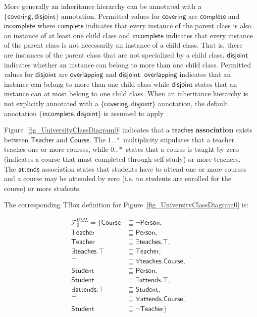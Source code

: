 \documentclass{amsart}
\begin{document}
       More generally an inheritance hierarchy can be annotated with a $\{\mathsf{covering, disjoint}\}$ annotation. Permitted values for $\mathsf{covering}$ are $\mathsf{complete}$ and $\mathsf{incomplete}$ where $\mathsf{complete}$ indicates that  every instance of the parent class is also an instance of at least one child class and $\mathsf{incomplete}$ indicates that every instance of the parent class is not necessarily an instance of a child class.  That is, there are instances of the parent class that are not specialized by a child class.  $\mathsf{disjoint}$ indicates whether an instance can belong to more than one child class.  Permitted values for $\mathsf{disjoint}$ are $\mathsf{overlapping}$ and $\mathsf{disjoint}$. $\mathsf{overlapping}$ indicates that an instance can belong to more than one child class while $\mathsf{disjoint}$ states  that an instance can at most belong to one child class. When an inheritance hierarchy is not explicitly annotated with a $\{\mathsf{covering, disjoint}\}$ annotation, the default annotation $\{\mathsf{incomplete, disjoint}\}$ is assumed to apply~\cite{UML2.5.1}. 
     
     Figure~\ref{fig_UniversityClassDiagram0} indicates that a $\mathsf{teaches}$ \textbf{association} exists between $\mathsf{Teacher}$ and $\mathsf{Course}$. The $1..*$ multiplicity stipulates that a teacher teaches one or more courses, while $0..*$ states that a course is taught by zero (indicates a course that must completed through self-study) or more teachers. The $\mathsf{attends}$ association states that students have to attend one or more courses and a course may be attended by zero (i.e. no students are enrolled for the course) or more students. 
     
     The corresponding TBox definition for Figure~\ref{fig_UniversityClassDiagram0} is:
     
   \begin{align}
  \mathcal{T}_0^{UML} = \{\mathsf{Course} &\sqsubseteq \neg \mathsf{Person},\\
  \mathsf{Teacher} &\sqsubseteq \mathsf{Person}, \\
  \mathsf{Teacher} &\sqsubseteq \exists \mathsf{teaches}.\top, \\
  \exists\mathsf{teaches}.\top &\sqsubseteq \mathsf{Teacher}, \\
  \top &\sqsubseteq \forall \mathsf{teaches}.\mathsf{Course}, \\
  \mathsf{Student} &\sqsubseteq \mathsf{Person},\\
  \mathsf{Student} &\sqsubseteq \exists \mathsf{attends}.\top, \\
  \exists\mathsf{attends}.\top &\sqsubseteq \mathsf{Student}, \\
  \top &\sqsubseteq \forall \mathsf{attends}.\mathsf{Course}, \\
  \mathsf{Student} &\sqsubseteq \neg \mathsf{Teacher}\}
  \end{align}   
  
\end{document}
